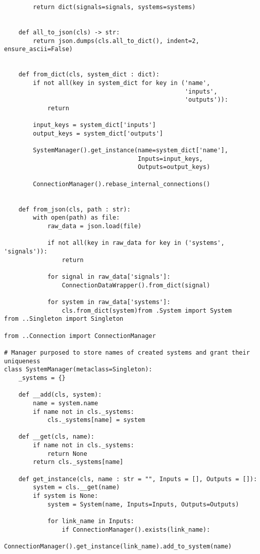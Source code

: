\begin{lstlisting}
        return dict(signals=signals, systems=systems)
    
    
    def all_to_json(cls) -> str:
        return json.dumps(cls.all_to_dict(), indent=2, ensure_ascii=False)
    
    
    def from_dict(cls, system_dict : dict):
        if not all(key in system_dict for key in ('name',
                                                  'inputs', 
                                                  'outputs')):
            return
        
        input_keys = system_dict['inputs']
        output_keys = system_dict['outputs']
        
        SystemManager().get_instance(name=system_dict['name'],
                                     Inputs=input_keys,
                                     Outputs=output_keys)
        
        ConnectionManager().rebase_internal_connections()
    
    
    def from_json(cls, path : str):
        with open(path) as file:
            raw_data = json.load(file)
            
            if not all(key in raw_data for key in ('systems', 'signals')):
                return
            
            for signal in raw_data['signals']:
                ConnectionDataWrapper().from_dict(signal)
            
            for system in raw_data['systems']:
                cls.from_dict(system)from .System import System
from ..Singleton import Singleton

from ..Connection import ConnectionManager

# Manager purposed to store names of created systems and grant their uniqueness
class SystemManager(metaclass=Singleton):
    _systems = {}

    def __add(cls, system):
        name = system.name
        if name not in cls._systems:
            cls._systems[name] = system
    
    def __get(cls, name):
        if name not in cls._systems:
            return None
        return cls._systems[name]
    
    def get_instance(cls, name : str = "", Inputs = [], Outputs = []):
        system = cls.__get(name)
        if system is None:
            system = System(name, Inputs=Inputs, Outputs=Outputs)
            
            for link_name in Inputs:
                if ConnectionManager().exists(link_name):
                    ConnectionManager().get_instance(link_name).add_to_system(name)
            

\end{lstlisting}
